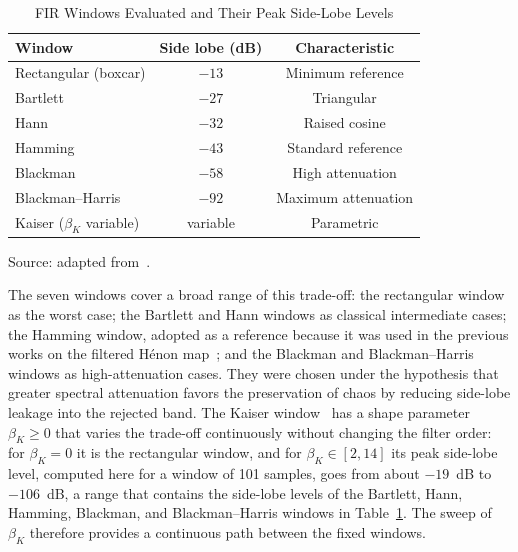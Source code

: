 \documentclass[journal]{IEEEtran}
\begin{document}
\begin{table}[!t]
\caption{FIR Windows Evaluated and Their Peak Side-Lobe Levels\label{tab:windows}}
\centering
\begin{tabular}{lcc}
\toprule
\textbf{Window} & \textbf{Side lobe (dB)} & \textbf{Characteristic} \\
\midrule
Rectangular (boxcar)          & $-13$    & Minimum reference \\
Bartlett                      & $-27$    & Triangular \\
Hann                          & $-32$    & Raised cosine \\
Hamming                       & $-43$    & Standard reference \\
Blackman                      & $-58$    & High attenuation \\
Blackman--Harris              & $-92$    & Maximum attenuation \\
Kaiser ($\beta_K$ variable)   & variable & Parametric \\
\bottomrule
\end{tabular}

\vspace{2pt}
{\footnotesize Source: adapted from~\cite{Harris1978}.}
\end{table}

The seven windows cover a broad range of this trade-off: the rectangular
window as the worst case; the Bartlett and Hann windows as classical
intermediate cases; the Hamming window, adopted as a reference because it was
used in the previous works on the filtered H\'enon
map~\cite{Fontes2016,Borges2022sbrt}; and the Blackman and Blackman--Harris
windows as high-attenuation cases. They were chosen under the hypothesis that
greater spectral attenuation favors the preservation of chaos by reducing
side-lobe leakage into the rejected band. The Kaiser
window~\cite{Kaiser1980} has a shape parameter $\beta_K\ge0$ that varies the
trade-off continuously without changing the filter order: for $\beta_K=0$ it
is the rectangular window, and for $\beta_K\in[2,14]$ its peak side-lobe
level, computed here for a window of 101 samples, goes from about $-19$~dB to
$-106$~dB, a range that contains the side-lobe levels of the Bartlett, Hann,
Hamming, Blackman, and Blackman--Harris windows in
Table~\ref{tab:windows}. The sweep of $\beta_K$ therefore provides a
continuous path between the fixed windows.

\end{document}

